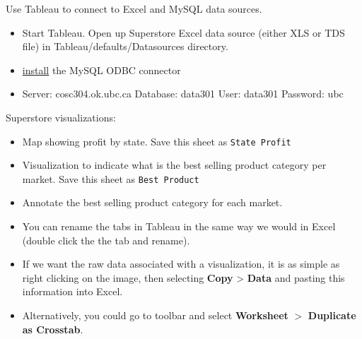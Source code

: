 \documentclass[xcolor=svgnames]{beamer} %
\begin{document}
\begin{frame}
\begin{example}
Use Tableau to connect to Excel and MySQL data sources.
\begin{itemize}
\item Start Tableau. Open up Superstore Excel data source (either XLS or TDS file) in Tableau/defaults/Datasources directory.
\item \href{https://dev.mysql.com/downloads/connector/odbc/}{install} the MySQL ODBC connector
\item  Server: cosc304.ok.ubc.ca  Database: data301  User: data301  Password: ubc
\end{itemize}

Superstore visualizations:
\begin{itemize}
\item Map showing profit by state. Save this sheet as {\tt State Profit}
\item Visualization to indicate what is the best selling product category per market. Save this sheet as {\tt Best Product}
\item Annotate the best selling product category for each market.
\end{itemize}
\end{example}

\end{frame}

\begin{frame}
\begin{itemize}
\item You can rename the tabs in Tableau in the same way we would in Excel (double click the the tab and rename).\vfill
\item If we want the raw data associated with a visualization, it is as simple as right clicking on the image, then selecting {\bf Copy} > {\bf Data} and pasting this information into Excel.\vfill
\item Alternatively, you could %
go to toolbar and select {\bf Worksheet} $>$ {\bf Duplicate as Crosstab}.
\end{itemize}

\end{frame}
\end{document}
